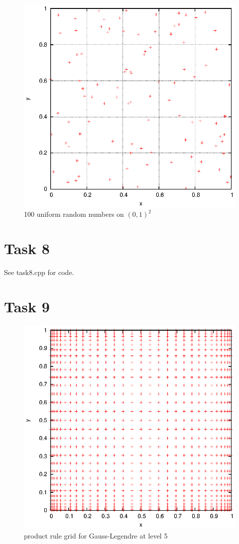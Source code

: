 \documentclass[]{article}
\begin{document}
\begin{figure}[!ht]
\includegraphics[width=.9\textwidth]{task7_uniform.eps}
\caption{100 uniform random numbers on $(0,1)^2$}
\label{fig:Task7b}
\end{figure}
\clearpage




\section*{Task 8}
See task8.cpp for code.

\section*{Task 9}
\begin{figure}[!ht]
\includegraphics[width=.9\textwidth]{task9_gauss}
\caption{product rule grid for Gauss-Legendre at level 5}
\label{fig:Task9a}
\end{figure}
\end{document}
